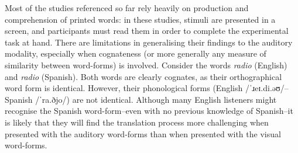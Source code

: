 \documentclass[
  english,
  man,floatsintext]{apa7}
\begin{document}
Most of the studies referenced so far rely heavily on production and comprehension of printed words: in these studies, stimuli are presented in a screen, and participants must read them in order to complete the experimental task at hand. There are limitations in generalising their findings to the auditory modality, especially when cognateness (or more generally any measure of similarity between word-forms) is involved. Consider the words \emph{radio} (English) and \emph{radio} (Spanish). Both words are clearly cognates, as their orthographical word form is identical. However, their phonological forms (English /ˈɹeɪ.di.əʊ/-- Spanish /ˈra.ðjo/) are not identical. Although many English listeners might recognise the Spanish word-form--even with no previous knowledge of Spanish--it is likely that they will find the translation process more challenging when presented with the auditory word-forms than when presented with the visual word-forms.
\end{document}
